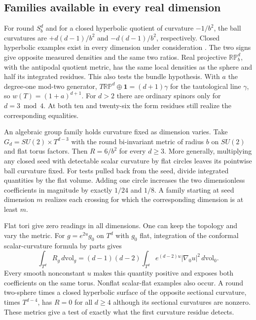 \documentclass[aps,prd,reprint,onecolumn,nofootinbib,amsmath,amssymb]{revtex4-2}
\newcommand{\dv}{\,d\mathrm{vol}_g}
\begin{document}
\subsection{Families available in every real dimension}

For round \(S^d_b\) and for a closed hyperbolic quotient of curvature
\(-1/b^2\), the ball curvatures are \(+d(d-1)/b^2\) and
\(-d(d-1)/b^2\), respectively. Closed hyperbolic examples exist in every
dimension under consideration \cite{Millson1976}. The two signs give
opposite measured densities and the same two ratios. Real projective
\(\mathbb{RP}^d_b\), with the antipodal quotient metric, has the same
local densities as the sphere and half its integrated residues. This
also tests the bundle hypothesis. With \(a\) the degree-one mod-two
generator, \(T\mathbb{RP}^d\oplus\mathbf 1=(d+1)\gamma\) for the
tautological line \(\gamma\), so \(w(T)=(1+a)^{d+1}\). For \(d>2\)
there are ordinary spinors only for \(d=3\bmod 4\). At both ten and
twenty-six the form residues still realize the corresponding equalities.

An algebraic group family holds curvature fixed as dimension varies.
Take \(G_d=SU(2)\times T^{d-3}\) with the round bi-invariant metric of
radius \(b\) on \(SU(2)\) and flat torus factors. Then
\(R=6/b^2\) for every \(d\ge3\). More generally, multiplying any
closed seed with detectable scalar curvature by flat circles leaves its
pointwise ball curvature fixed. For tests pulled back from the seed,
divide integrated quantities by the flat volume. Adding one circle
increases the two dimensionless coefficients in magnitude by exactly
\(1/24\) and \(1/8\). A family starting at seed dimension \(m\) realizes
each crossing for which the corresponding dimension is at least \(m\).

Flat tori give zero readings in all dimensions. One can keep the topology
and vary the metric. For \(g=e^{2u}g_0\) on \(T^d\) with \(g_0\) flat,
integration of the conformal scalar-curvature formula by parts gives
\begin{equation}
 \int_{T^d} R_g\dv
 =(d-1)(d-2)\int_{T^d}e^{(d-2)u}
           |\nabla_0 u|^2\,d\mathrm{vol}_0 .
 \label{eq:torus}
\end{equation}
Every smooth nonconstant \(u\) makes this quantity positive and exposes
both coefficients on the same torus. Nonflat scalar-flat examples also
occur. A round two-sphere times a closed hyperbolic surface of the
opposite sectional curvature, times \(T^{d-4}\), has \(R=0\) for all
\(d\ge4\) although its sectional curvatures are nonzero. These metrics
give a test of exactly what the first curvature residue detects.
\end{document}
